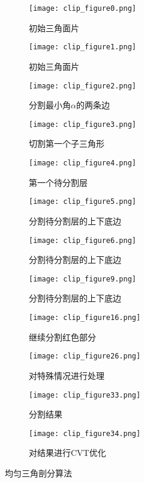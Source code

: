 \begin{figure}[htbp]
	\centering
	\begin{subfigure}[b]{.32\textwidth}
		\centering
		\texttt{[image: clip\_figure0.png]}
		\caption{初始三角面片}\label{subfig:clip0}
	\end{subfigure}
	\begin{subfigure}[b]{.32\textwidth}
		\centering
		\texttt{[image: clip\_figure1.png]}
		\caption{初始三角面片}\label{subfig:clip1}
	\end{subfigure}
	\begin{subfigure}[b]{.32\textwidth}
		\centering
		\texttt{[image: clip\_figure2.png]}
		\caption{分割最小角$\alpha$的两条边}\label{subfig:clip2}
	\end{subfigure}

	\begin{subfigure}[b]{.32\textwidth}
		\centering
		\texttt{[image: clip\_figure3.png]}
		\caption{切割第一个子三角形}\label{subfig:clip3}
	\end{subfigure}
	\begin{subfigure}[b]{.32\textwidth}
		\centering
		\texttt{[image: clip\_figure4.png]}
		\caption{第一个待分割层}\label{subfig:clip4}
	\end{subfigure}
	\begin{subfigure}[b]{.32\textwidth}
		\centering
		\texttt{[image: clip\_figure5.png]}
		\caption{分割待分割层的上下底边}\label{subfig:clip5}
	\end{subfigure}

	\begin{subfigure}[b]{.32\textwidth}
		\centering
		\texttt{[image: clip\_figure6.png]}
		\caption{分割待分割层的上下底边}\label{subfig:clip6}
	\end{subfigure}
	\begin{subfigure}[b]{.32\textwidth}
		\centering
		\texttt{[image: clip\_figure9.png]}
		\caption{分割待分割层的上下底边}\label{subfig:clip9}
	\end{subfigure}
	\begin{subfigure}[b]{.32\textwidth}
		\centering
		\texttt{[image: clip\_figure16.png]}
		\caption{继续分割红色部分}\label{subfig:clip16}
	\end{subfigure}

	\begin{subfigure}[b]{.32\textwidth}
		\centering
		\texttt{[image: clip\_figure26.png]}
		\caption{对特殊情况进行处理}\label{subfig:clip26}
	\end{subfigure}
	\begin{subfigure}[b]{.32\textwidth}
		\centering
		\texttt{[image: clip\_figure33.png]}
		\caption{分割结果}\label{subfig:clip33}
	\end{subfigure}
	\begin{subfigure}[b]{.32\textwidth}
		\centering
		\texttt{[image: clip\_figure34.png]}
		\caption{对结果进行CVT优化}\label{subfig:clip34}
	\end{subfigure}
	\caption{均匀三角剖分算法}\label{fig:clip}
\end{figure}

